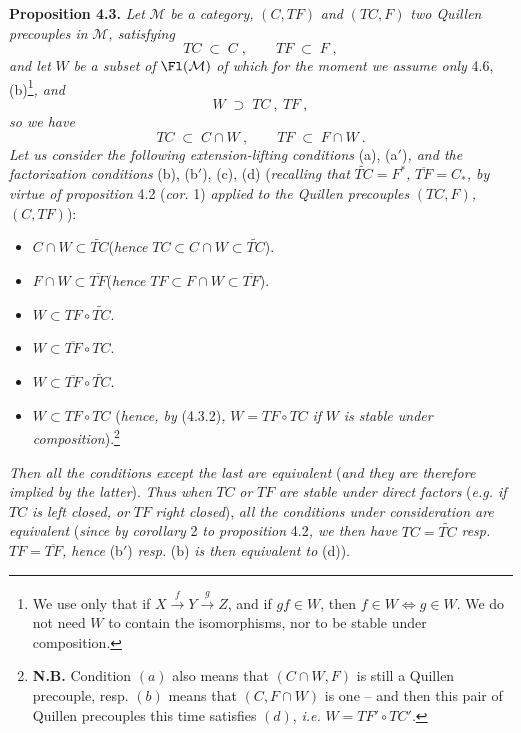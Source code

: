 \textbf{Proposition 4.3.} \textit{Let} $\mathcal{M}$ \textit{be a category,} $(C,TF)$ \textit{and} $(TC,F)$ \textit{two Quillen precouples in} $\mathcal{M}$\textit{, satisfying}
\[
TC \;\subset\; C\;, \qquad TF \;\subset\; F\;,
\tag*{(4.3.1)}
\]
\textit{and let} $W$ \textit{be a subset of} $\Fl(\mathcal{M})$ \textit{of which for the moment we assume only} 4.6, (b)\footnote[10]{We use only that if $X\xrightarrow{\;f\;}Y\xrightarrow{\;g\;}Z$, and if $gf\in W$, then $f\in W\Longleftrightarrow g\in W$. We do not need $W$ to contain the isomorphisms, nor to be stable under composition.}\textit{, and} %
\[
W \;\supset\; TC\ ,\ TF\ ,
\tag*{(4.3.2)}
\]
\textit{so we have}
\[
TC \;\subset\; C\cap W\ , \qquad TF \;\subset\; F\cap W\ .
\tag*{(4.3.3)}
\]
\textit{Let us consider the following extension-lifting conditions} (a), (a$'$)\textit{, and the factorization conditions} (b), (b$'$), (c), (d) (\textit{recalling that} $\widetilde{TC}=F^*$\textit{,} $\overline{TF}=C_*$\textit{, by virtue of proposition} 4.2 (\textit{cor.} 1) \textit{applied to the Quillen precouples} $(TC,F)$\textit{,} $(C,TF)$):
\begin{itemize}[leftmargin=2.5em]
\item[a)] $C\cap W\subset\widetilde{TC}$\quad (\textit{hence} $TC\subset C\cap W\subset\widetilde{TC}$).
\item[a$'$)] $F\cap W\subset\overline{TF}$\quad (\textit{hence} $TF\subset F\cap W\subset\overline{TF}$).
\item[b)] $W\subset TF\circ\widetilde{TC}$.
\item[b$'$)] $W\subset\overline{TF}\circ TC$.
\item[c)] $W\subset\overline{TF}\circ\widetilde{TC}$.
\item[d)] $W\subset TF{\circ}TC$ (\textit{hence, by} (4.3.2)\textit{,} $W=TF{\circ}TC$ \textit{if} $W$ \textit{is stable under composition}).\footnote[11]{\textbf{N.B.} Condition $(a)$ also means that $(C\cap W,F)$ is still a Quillen precouple, resp. $(b)$ means that $(C,F\cap W)$ is one -- and then this pair of Quillen precouples this time satisfies $(d)$, \textit{i.e.} $W=TF'\circ TC'$.} %
\end{itemize}

\textit{Then all the conditions except the last are equivalent} (\textit{and they are therefore implied by the latter}). \textit{Thus when} $TC$ \textit{or} $TF$ \textit{are stable under direct factors} (\textit{e.g. if} $TC$ \textit{is left closed, or} $TF$ \textit{right closed}), \textit{all the conditions under consideration are equivalent} (\textit{since by corollary} 2 \textit{to proposition} 4.2\textit{, we then have} $TC=\widetilde{TC}$ \textit{resp.} $TF=\overline{TF}$\textit{, hence} (b$'$) \textit{resp.} (b) \textit{is then equivalent to} (d)).


